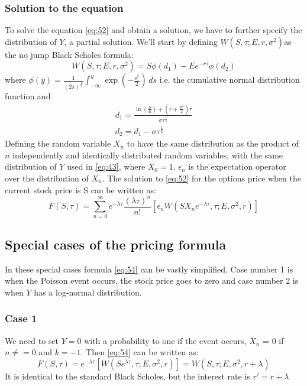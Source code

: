 \documentclass{article}
\begin{document}
\subsubsection{Solution to the equation}
To solve the equation \ref{eq:52} and obtain a solution, we have to further specify the distribution of $Y$, a partial solution. We’ll start by defining $W(S, \tau; E, r, \sigma^2) $as the no jump Black Scholes formula:
\begin{equation}
    W(S, \tau; E, r, \sigma^2) = S \phi (d_{1}) - E e^{-r\tau} \phi(d_{2})
\end{equation}
where $\phi(y) = \frac{1}{(2\pi)^{\frac{1}{2}}}\int_{-\infty}^{y}\exp\left({-\frac{s^{2}}{2}}\right)\,ds$ i.e. the cumulative normal distribution function
and 
\begin{gather*}
    d_{1} = \frac{\ln\left(\frac{S}{E}\right)+\left(r+\frac{\sigma^{2}}{2}\right)\tau}{\sigma \tau^{\frac{1}{2}}} \\
    d_{2} = d_{1} - \sigma \tau^{\frac{1}{2}}
\end{gather*}
Defining the random variable $X_{n}$ to have the same distribution as the product of $n$ independently and identically distributed random variables, with the same distribution of $Y$ used in \ref{eq:43}, where $X_{0} = 1$. $\epsilon_{n}$ is the expectation operator over the distribution of $X_{n}$. The solution to \ref{eq:52} for the options price when the current stock price is S can be written as:
\begin{equation} \label{eq:54}
    F(S, \tau) = \sum_{n=0}^{\infty} e^{-\lambda \tau}\frac{(\lambda \tau)^{n}}{n!} \left[\epsilon_{n} W(SX_{n}e^{-\lambda \tau}, \tau; E, \sigma^2, r) \right]
\end{equation}
\subsection{Special cases of the pricing formula}
In these special cases formula \ref{eq:54} can be vastly simplified. Case number 1 is when the Poisson event occurs, the stock price goes to zero and case number 2 is when $Y$ has a log-normal distribution.
\subsubsection{Case 1}
We need to set $Y = 0$ with a probability to one if the event occurs, $X_{n}$ = 0 if $n \neq= 0$ and $k = -1$. Then \ref{eq:54} can be written as:
\begin{equation}
    F(S, \tau) =  e^{-\lambda \tau}\left[W(Se^{\lambda \tau}, \tau; E, \sigma^2, r) \right] = W(S, \tau; E, \sigma^2, r + \lambda)
\end{equation}
It is identical to the standard Black Scholes, but the interest rate is $r' = r + \lambda$
\end{document}
